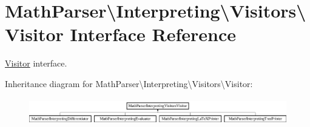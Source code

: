 \hypertarget{interfaceMathParser_1_1Interpreting_1_1Visitors_1_1Visitor}{\section{Math\-Parser\textbackslash{}Interpreting\textbackslash{}Visitors\textbackslash{}Visitor Interface Reference}
\label{interfaceMathParser_1_1Interpreting_1_1Visitors_1_1Visitor}
}


\hyperlink{interfaceMathParser_1_1Interpreting_1_1Visitors_1_1Visitor}{Visitor} interface.  


Inheritance diagram for Math\-Parser\textbackslash{}Interpreting\textbackslash{}Visitors\textbackslash{}Visitor\-:\begin{figure}[H]
\begin{center}
\leavevmode
\includegraphics[height=1.166667cm]{interfaceMathParser_1_1Interpreting_1_1Visitors_1_1Visitor}
\end{center}
\end{figure}

